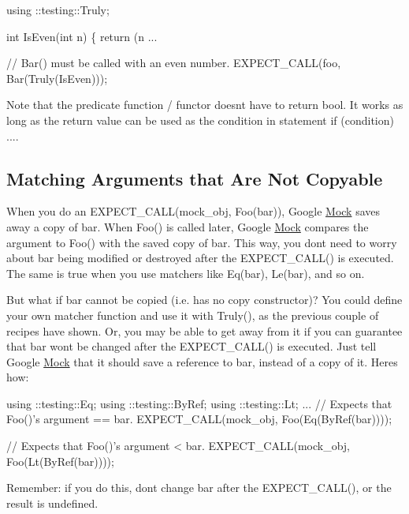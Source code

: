 \begin{DoxyCode}
using ::testing::Truly;

int IsEven(int n) \{ return (n %
...

  // Bar() must be called with an even number.
  EXPECT\_CALL(foo, Bar(Truly(IsEven)));
\end{DoxyCode}


Note that the predicate function / functor doesn\textquotesingle{}t have to return {\ttfamily bool}. It works as long as the return value can be used as the condition in statement {\ttfamily if (condition) ...}.

\subsection*{Matching Arguments that Are Not Copyable}

When you do an {\ttfamily E\+X\+P\+E\+C\+T\+\_\+\+C\+A\+L\+L(mock\+\_\+obj, Foo(bar))}, Google \hyperlink{class_mock}{Mock} saves away a copy of {\ttfamily bar}. When {\ttfamily Foo()} is called later, Google \hyperlink{class_mock}{Mock} compares the argument to {\ttfamily Foo()} with the saved copy of {\ttfamily bar}. This way, you don\textquotesingle{}t need to worry about {\ttfamily bar} being modified or destroyed after the {\ttfamily E\+X\+P\+E\+C\+T\+\_\+\+C\+A\+L\+L()} is executed. The same is true when you use matchers like {\ttfamily Eq(bar)}, {\ttfamily Le(bar)}, and so on.

But what if {\ttfamily bar} cannot be copied (i.\+e. has no copy constructor)? You could define your own matcher function and use it with {\ttfamily Truly()}, as the previous couple of recipes have shown. Or, you may be able to get away from it if you can guarantee that {\ttfamily bar} won\textquotesingle{}t be changed after the {\ttfamily E\+X\+P\+E\+C\+T\+\_\+\+C\+A\+L\+L()} is executed. Just tell Google \hyperlink{class_mock}{Mock} that it should save a reference to {\ttfamily bar}, instead of a copy of it. Here\textquotesingle{}s how\+:


\begin{DoxyCode}
using ::testing::Eq;
using ::testing::ByRef;
using ::testing::Lt;
...
  // Expects that Foo()'s argument == bar.
  EXPECT\_CALL(mock\_obj, Foo(Eq(ByRef(bar))));

  // Expects that Foo()'s argument < bar.
  EXPECT\_CALL(mock\_obj, Foo(Lt(ByRef(bar))));
\end{DoxyCode}


Remember\+: if you do this, don\textquotesingle{}t change {\ttfamily bar} after the {\ttfamily E\+X\+P\+E\+C\+T\+\_\+\+C\+A\+L\+L()}, or the result is undefined.

